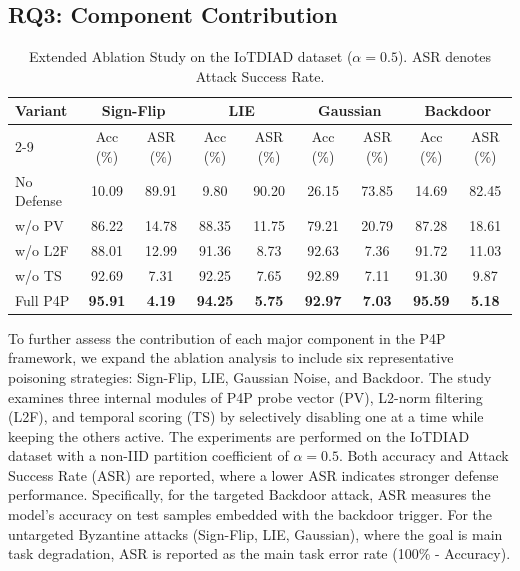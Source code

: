 \subsection{RQ3: Component Contribution}
\label{subsec:ablation}

\begin{table}[t]
\centering
\caption{Extended Ablation Study on the IoTDIAD dataset ($\alpha = 0.5$). ASR denotes Attack Success Rate.}
\label{tab:ablation_extended}
\begin{tabular}{lcccccccc}
\toprule
Variant 
& \multicolumn{2}{c}{Sign-Flip} 
& \multicolumn{2}{c}{LIE} 
& \multicolumn{2}{c}{Gaussian} 
& \multicolumn{2}{c}{Backdoor} \\ 
\cmidrule(lr){2-9}
& Acc (\%) & ASR (\%) & Acc (\%) & ASR (\%) & Acc (\%) & ASR (\%) & Acc (\%) & ASR (\%) \\
\midrule
No Defense   & 10.09 & 89.91 & 9.80 & 90.20 & 26.15 & 73.85 & 14.69 & 82.45 \\
w/o PV       & 86.22 & 14.78 & 88.35 & 11.75 & 79.21 & 20.79 & 87.28 & 18.61 \\
w/o L2F      & 88.01 & 12.99 & 91.36 & 8.73  & 92.63 & 7.36  & 91.72 & 11.03 \\
w/o TS       & 92.69 & 7.31  & 92.25 & 7.65  & 92.89 & 7.11  & 91.30 & 9.87  \\
Full P4P     & \textbf{95.91} & \textbf{4.19}  & \textbf{94.25} & \textbf{5.75}  & \textbf{92.97} & \textbf{7.03}  & \textbf{95.59} & \textbf{5.18}  \\
\bottomrule
\end{tabular}
\end{table}

To further assess the contribution of each major component in the P4P framework, we expand the ablation analysis to include six representative poisoning strategies: Sign-Flip, LIE, Gaussian Noise, and Backdoor. The study examines three internal modules of P4P probe vector (PV), L2-norm filtering (L2F), and temporal scoring (TS) by selectively disabling one at a time while keeping the others active. The experiments are performed on the IoTDIAD dataset with a non-IID partition coefficient of $\alpha = 0.5$. Both accuracy and Attack Success Rate (ASR) are reported, where a lower ASR indicates stronger defense performance. Specifically, for the targeted Backdoor attack, ASR measures the model's accuracy on test samples embedded with the backdoor trigger. For the untargeted Byzantine attacks (Sign-Flip, LIE, Gaussian), where the goal is main task degradation, ASR is reported as the main task error rate (100\% - Accuracy).

